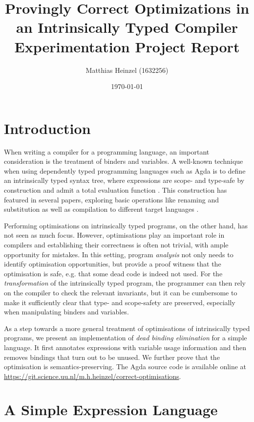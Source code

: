 \documentclass[11pt,a4paper]{article}
\title{Provingly Correct Optimizations in an Intrinsically Typed Compiler\\
  \vspace{1cm}
  \large Experimentation Project Report}
\author{Matthias Heinzel (1632256)}
\date{\today}
\begin{document}
\maketitle
\tableofcontents
\pagebreak

\section{Introduction}

When writing a compiler for a programming language,
an important consideration is the treatment of binders and variables.
A well-known technique when using dependently typed programming languages such as Agda
\cite{norell2007agda}
is to define an intrinsically typed syntax tree,
where expressions are scope- and type-safe by construction and admit a total evaluation function
\cite{augustsson1999intrinsic}.
This construction has featured in several papers, exploring
basic operations like renaming and substitution
\cite{allais2018universe}
as well as compilation to different target languages
\cite[supplemental material]{pickard2021calculating}.

Performing optimisations on intrinsically typed programs, on the other hand,
has not seen as much focus.
However, optimisations play an important role in compilers
and establishing their correctness is often not trivial,
with ample opportunity for mistakes.
%
In this setting, program \emph{analysis} not only needs to identify optimisation opportunities,
but provide a proof witness that the optimisation is safe,
e.g. that some dead code is indeed not used.
For the \emph{transformation} of the intrinsically typed program,
the programmer can then rely on the compiler to check the relevant invariants,
but it can be cumbersome to make it sufficiently clear that type- and scope-safety are preserved,
especially when manipulating binders and variables.

As a step towards a more general treatment of optimisations of intrinsically typed programs,
we present an implementation of \emph{dead binding elimination} for a simple language.
It first annotates expressions with variable usage information
and then removes bindings that turn out to be unused.
We further prove that the optimisation is semantics-preserving.
The Agda source code is available online at
\url{https://git.science.uu.nl/m.h.heinzel/correct-optimisations}.

\section{A Simple Expression Language}
\end{document}
